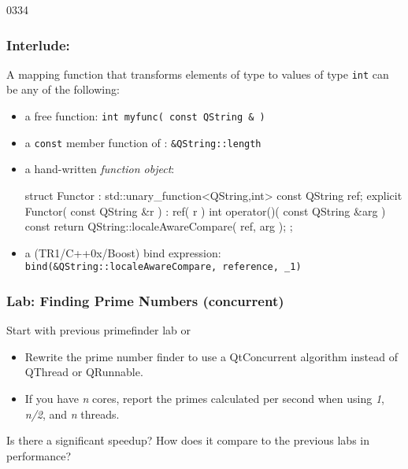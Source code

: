 \begin{slide}[fragile]{0334}
\frametitle{Interlude: }
  A mapping function that transforms elements of type  to
  values of type \texttt{int} can be any of the following:
  \begin{itemize}
  \item a free function:
    \texttt{int myfunc( const QString \& )}
  \item a \texttt{const} member function of :
    \texttt{\&QString::length}
  \item a hand-written \emph{function object}:
    \begin{cpp}
struct Functor : std::unary_function<QString,int> {
  const QString ref;
  explicit Functor( const QString &r ) : ref( r ) {}
  int operator()( const QString &arg ) const {
    return QString::localeAwareCompare( ref, arg );
  }
};\end{cpp}
  \item a (TR1/C++0x/Boost) bind expression:\\
    \texttt{bind(\&QString::localeAwareCompare, reference, \_1)}
  \end{itemize}
\end{slide}

\begin{slide}
\frametitle{Lab: Finding Prime Numbers (concurrent)}
Start with previous primefinder lab or 
\begin{itemize}
\item Rewrite the prime number finder to use a QtConcurrent algorithm instead of
QThread or QRunnable.
\item If you have \textit{n} cores, report the primes calculated per second when 
using \textit{1}, \textit{n/2}, and \textit{n} threads. 
\end{itemize}
Is there a significant speedup? How does it compare to the previous labs in performance?
\end{slide}

